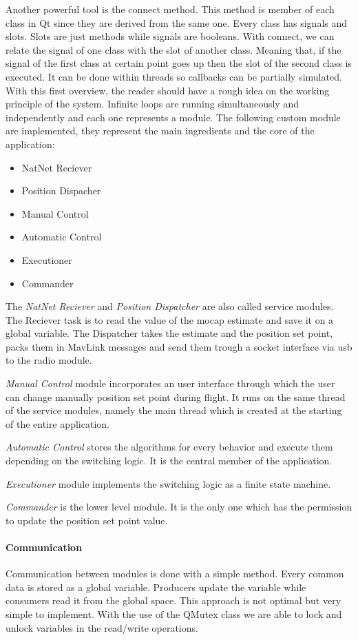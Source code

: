 Another powerful tool is the connect method. This method is member of each class in Qt since they are derived from the same one. Every class has signals and slots. Slots are just methods while signals are booleans. With connect, we can relate the signal of one class with the slot of another class. Meaning that, if the signal of the first class at certain point goes up then the slot of the second class is executed. It can be done within threads so callbacks can be partially simulated. 
With this first overview, the reader should have a rough idea on the working principle of the system. Infinite loops are running simultaneously and independently and each one represents a module. The following custom module are implemented, they represent the main ingredients and the core of the application: \begin{itemize}
\item NatNet Reciever
\item Position Dispacher 
\item Manual Control
\item Automatic Control 
\item Executioner
\item Commander
\end{itemize}
The \textit{NatNet Reciever} and \textit{Position Dispatcher} are also called service modules. The Reciever task is to read the value of the mocap estimate and save it on a global variable. The Dispatcher takes the estimate and the position set point, packs them in MavLink messages and send them trough a socket interface via usb to the radio module. 

\textit{Manual Control} module incorporates an user interface through which the user can change manually position set point during flight. It runs on the same thread of the service modules, namely the main thread which is created at the starting of the entire application. 

\textit{Automatic Control} stores the algorithms for every behavior and execute them depending on the switching logic. It is the central member of the application.

\textit{Executioner} module implements the switching logic as a finite state machine.

\textit{Commander} is the lower level module. It is the only one which has the permission to update the position set point value.

\paragraph{Communication} Communication between modules is done with a simple method. Every common data is stored as a global variable. Producers update the variable while consumers read it from the global space. This approach is not optimal but very simple to implement. With the use of the QMutex class we are able to lock and unlock variables in the read/write operations.

